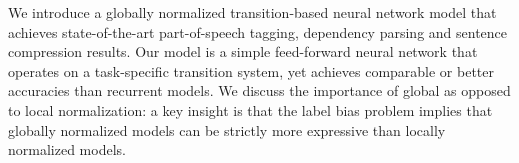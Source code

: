 We introduce a globally normalized transition-based neural network model that achieves state-of-the-art part-of-speech tagging, dependency parsing and sentence compression results.  Our model is a simple feed-forward neural network that operates on a task-specific transition system, yet achieves comparable or better accuracies than recurrent models. We discuss the importance of global as opposed to local normalization: a key insight is that the label bias problem implies that globally normalized models can be strictly more expressive than locally normalized models.
